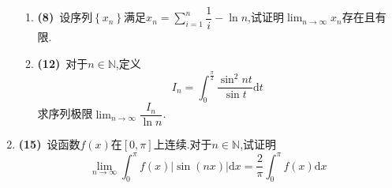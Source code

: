 \documentclass{ctexart}
\newcommand{\di}{\mathrm{d}}
\newcommand{\N}{\mathbb{N}}
\newcommand{\dx}{\di x}
\begin{document}
\begin{enumerate}[leftmargin=*,label=\textbf{\arabic*.}]
\begin{enumerate}[label=\textbf{(\arabic*)}]
            \item \textbf{(8)}\ 设序列$\left\{x_n\right\}$满足$\displaystyle x_n=\sum_{i=1}^n\dfrac{1}{i}-\ln n$,试证明$\displaystyle\lim_{n\to\infty}x_n$存在且有限.
            \item \textbf{(12)}\ 对于$n\in\N$,定义$$I_n=\int_0^\frac{\pi}{2}\dfrac{\sin^2nt}{\sin t}\di t$$求序列极限$\displaystyle\lim_{n\to\infty}\dfrac{I_n}{\ln n}$.
        \end{enumerate}
    \item \textbf{(15)}\ 设函数$f(x)$在$[0,\pi]$上连续.对于$n\in\N$,试证明$$\lim_{n\to\infty}\int_{0}^{\pi}f(x)\left|\sin(nx)\right|\dx=\dfrac{2}{\pi}\int_0^\pi f(x)\dx$$
\end{enumerate}
\end{document}
